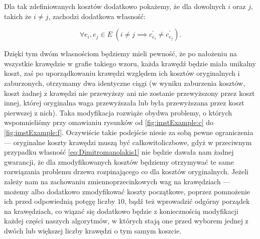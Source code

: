 Dla tak zdefiniowanych kosztów dodatkowo pokażemy, że dla dowolnych $i$ oraz $j$, takich że $i \neq j$, zachodzi dodatkowa własność:

\begin{equation}\label{eq:Dimitromanolakis2}
	\forall e_{i}, e_{j} \in E \; \left( i \neq j \implies c^{\prime}_{e_{i}} \neq c^{\prime}_{e_{j}} \right)\text{.}
\end{equation}

Dzięki tym dwóm własnościom będziemy mieli pewność, że po nałożeniu na wszystkie krawędzie w grafie takiego wzoru, każda krawędź będzie miała unikalny koszt, zaś po uporządkowaniu krawędzi względem ich kosztów oryginalnych i zaburzonych, otrzymamy dwa identyczne ciągi (w wyniku zaburzenia kosztów, koszt żadnej z krawędzi nie przewyższy ani nie zostanie przewyższony przez koszt innej, której oryginalna waga przewyższała lub była przewyższana przez koszt pierwszej z nich). Taka modyfikacja rozwiąże obydwa problemy, o których wspomnieliśmy przy omawianiu rysunków od \ref{fig:imstExample:c} do \ref{fig:imstExample:f}. Oczywiście takie podejście niesie za sobą pewne ograniczenia --- oryginalne koszty krawędzi muszą być całkowitoliczbowe, gdyż w przeciwnym przypadku własność \ref{eq:Dimitromanolakis1} nie będzie dawała nam żadnej gwarancji, że dla zmodyfikowanych kosztów będziemy otrzymywać te same rozwiązania problemu drzewa rozpinającego co dla kosztów oryginalnych. Jeżeli zależy nam na zachowaniu zmiennoprzecinkowych wag na krawędziach --- możemy albo dodatkowo zmodyfikować koszty początkowe, poprzez pomnożenie ich przed odpowiednią potęgę liczby $10$, bądź też wprowadzić odgórny porządek na krawędziach, co wiązać się dodatkowo będzie z koniecznością modyfikacji każdej części naszych algorytmów, w których stają one przed wyborem jednej z dwóch lub większej liczby krawędzi o tym samym koszcie.

